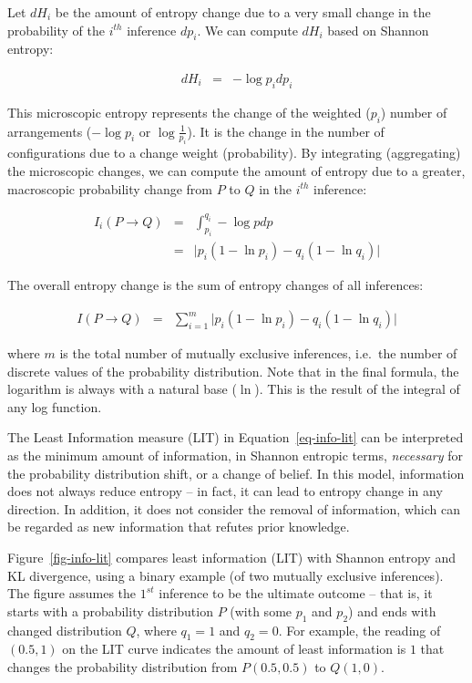 \documentclass[
  letterpaper,
]{scrbook}
\begin{document}
Let \(dH_i\) be the amount of entropy change due to a very small change
in the probability of the \(i^{th}\) inference \(dp_i\). We can compute
\(dH_i\) based on Shannon entropy:

\[\begin{aligned}
  dH_i & = & - \log p_i dp_i
\end{aligned}\]

This microscopic entropy represents the change of the weighted (\(p_i\))
number of arrangements (\(- \log p_i\) or \(\log \frac{1}{p_i}\)). It is
the change in the number of configurations due to a change weight
(probability). By integrating (aggregating) the microscopic changes, we
can compute the amount of entropy due to a greater, macroscopic
probability change from \(P\) to \(Q\) in the \(i^{th}\) inference:

\[\begin{aligned}
  I_i(P \to Q)
  & = & \int_{p_i}^{q_i} - \log p dp \\
  & = & \big| p_i (1-\ln p_i) - q_i (1-\ln q_i) \big|
\end{aligned}\]

The overall entropy change is the sum of entropy changes of all
inferences:

\[\begin{aligned}
  I(P \to Q)
  & = & \sum_{i=1}^{m} \big| p_i (1-\ln p_i) - q_i (1-\ln q_i) \big|
\end{aligned}\]

where \(m\) is the total number of mutually exclusive inferences,
i.e.~the number of discrete values of the probability distribution. Note
that in the final formula, the logarithm is always with a natural base
(\(\ln\)). This is the result of the integral of any log function.

The Least Information measure (LIT) in
Equation~\hyperref[eq-info-lit]{{[}eq-info-lit{]}} can be interpreted as
the minimum amount of information, in Shannon entropic terms,
\emph{necessary} for the probability distribution shift, or a change of
belief. In this model, information does not always reduce entropy -- in
fact, it can lead to entropy change in any direction. In addition, it
does not consider the removal of information, which can be regarded as
new information that refutes prior knowledge.

Figure~\ref{fig-info-lit} compares least information (LIT) with Shannon
entropy and KL divergence, using a binary example (of two mutually
exclusive inferences). The figure assumes the \(1^{st}\) inference to be
the ultimate outcome -- that is, it starts with a probability
distribution \(P\) (with some \(p_1\) and \(p_2\)) and ends with changed
distribution \(Q\), where \(q_1=1\) and \(q_2=0\). For example, the
reading of \((0.5, 1)\) on the LIT curve indicates the amount of least
information is \(1\) that changes the probability distribution from
\(P(0.5, 0.5)\) to \(Q(1, 0)\).
\end{document}
